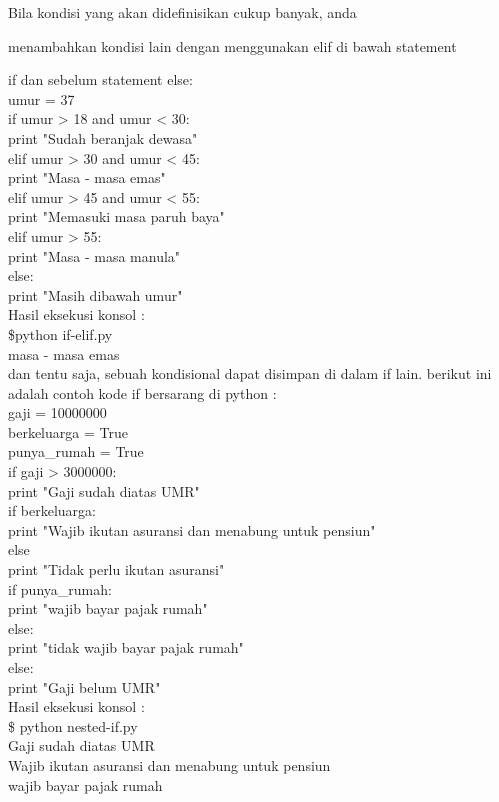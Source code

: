 Bila kondisi yang akan didefinisikan cukup banyak, anda 

menambahkan kondisi lain dengan menggunakan elif di bawah statement

if dan sebelum statement else:\\
umur = 37\\
if umur > 18 and umur < 30:\\
    print "Sudah beranjak dewasa"\\
elif umur > 30 and umur < 45:\\
    print "Masa - masa emas"\\
elif umur > 45 and umur < 55:\\
    print "Memasuki masa paruh baya"\\
elif umur > 55:\\
    print "Masa - masa manula"\\
else:\\
    print "Masih dibawah umur" \\
    Hasil eksekusi konsol :\\ 
    \$python if-elif.py\\
    masa - masa emas\\
    dan tentu saja, sebuah kondisional dapat disimpan di dalam if lain. berikut ini adalah contoh kode if bersarang di python : \\
    gaji = 10000000\\
berkeluarga = True\\
punya\_rumah = True\\

if gaji > 3000000:\\
    print "Gaji sudah diatas UMR"\\
    if berkeluarga:\\
        print "Wajib ikutan asuransi dan menabung untuk pensiun"\\
    else\\
        print "Tidak perlu ikutan asuransi"\\

    if punya\_rumah:\\
        print "wajib bayar pajak rumah"\\
    else:\\
        print "tidak wajib bayar pajak rumah"\\
else:\\
    print "Gaji belum UMR"\\
     Hasil eksekusi konsol :\\ 
     \$ python nested-if.py \\
Gaji sudah diatas UMR\\
Wajib ikutan asuransi dan menabung untuk pensiun\\
wajib bayar pajak rumah\\

